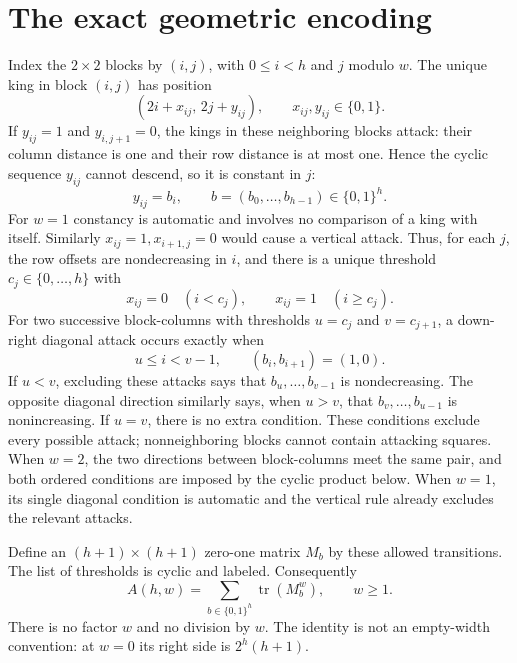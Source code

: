 \documentclass[11pt,letterpaper]{article}
\numberwithin{equation}{section}
\theoremstyle{remark}\newtheorem{remark}[theorem]{Remark}
\DeclareMathOperator{\tr}{tr}\DeclareMathOperator{\TV}{TV}
\begin{document}
\section{The exact geometric encoding}\label{mdk:asp:sec:encoding}
Index the $2\times2$ blocks by $(i,j)$, with $0\le i<h$ and $j$ modulo $w$. The unique king in block $(i,j)$ has position
\[
(2i+x_{ij},\,2j+y_{ij}),\qquad x_{ij},y_{ij}\in\{0,1\}.
\]
If $y_{ij}=1$ and $y_{i,j+1}=0$, the kings in these neighboring blocks attack: their column distance is one and their row distance is at most one. Hence the cyclic sequence $y_{ij}$ cannot descend, so it is constant in $j$:
\begin{equation}\label{mdk:asp:eq:word}
y_{ij}=b_i,\qquad b=(b_0,\ldots,b_{h-1})\in\{0,1\}^h.
\end{equation}
For $w=1$ constancy is automatic and involves no comparison of a king with itself. Similarly $x_{ij}=1,x_{i+1,j}=0$ would cause a vertical attack. Thus, for each $j$, the row offsets are nondecreasing in $i$, and there is a unique threshold $c_j\in\{0,\ldots,h\}$ with
\[
x_{ij}=0\quad(i<c_j),\qquad x_{ij}=1\quad(i\ge c_j).
\]
For two successive block-columns with thresholds $u=c_j$ and $v=c_{j+1}$, a down-right diagonal attack occurs exactly when
\[
u\le i<v-1,\qquad (b_i,b_{i+1})=(1,0).
\]
If $u<v$, excluding these attacks says that $b_u,\ldots,b_{v-1}$ is nondecreasing. The opposite diagonal direction similarly says, when $u>v$, that $b_v,\ldots,b_{u-1}$ is nonincreasing. If $u=v$, there is no extra condition. These conditions exclude every possible attack; nonneighboring blocks cannot contain attacking squares. When $w=2$, the two directions between block-columns meet the same pair, and both ordered conditions are imposed by the cyclic product below. When $w=1$, its single diagonal condition is automatic and the vertical rule already excludes the relevant attacks.

Define an $(h+1)\times(h+1)$ zero-one matrix $M_b$ by these allowed transitions. The list of thresholds is cyclic and labeled. Consequently
\begin{equation}\label{mdk:asp:eq:trace}
A(h,w)=\sum_{b\in\{0,1\}^h}\tr(M_b^w),\qquad w\ge1.
\end{equation}
There is no factor $w$ and no division by $w$. The identity is not an empty-width convention: at $w=0$ its right side is $2^h(h+1)$.
\end{document}

